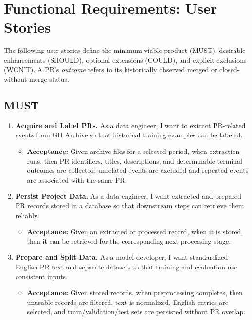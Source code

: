 \documentclass[conference,a4paper,flushend]{cs-techrep}
\begin{document}
\section{Functional Requirements: User Stories}
The following user stories define the minimum viable product (MUST), desirable enhancements (SHOULD), optional extensions (COULD), and explicit exclusions (WON'T). A PR's \emph{outcome} refers to its historically observed merged or closed-without-merge status.

\subsection{MUST}
\begin{enumerate}[label={US\arabic*},series=stories]
\item \textbf{Acquire and Label PRs.} As a data engineer, I want to extract PR-related events from GH Archive so that historical training examples can be labeled.
  \begin{itemize}
    \item \textbf{Acceptance:} Given archive files for a selected period, when extraction runs, then PR identifiers, titles, descriptions, and determinable terminal outcomes are collected; unrelated events are excluded and repeated events are associated with the same PR.
  \end{itemize}

\item \textbf{Persist Project Data.} As a data engineer, I want extracted and prepared PR records stored in a database so that downstream steps can retrieve them reliably.
  \begin{itemize}
    \item \textbf{Acceptance:} Given an extracted or processed record, when it is stored, then it can be retrieved for the corresponding next processing stage.
  \end{itemize}

\item \textbf{Prepare and Split Data.} As a model developer, I want standardized English PR text and separate datasets so that training and evaluation use consistent inputs.
  \begin{itemize}
    \item \textbf{Acceptance:} Given stored records, when preprocessing completes, then unusable records are filtered, text is normalized, English entries are selected, and train/validation/test sets are persisted without PR overlap.
  \end{itemize}


\end{enumerate}
\end{document}
